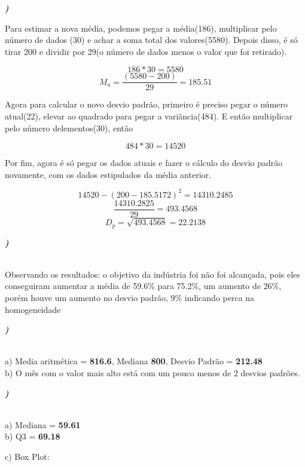 \documentclass[12pt]{article}
\newcounter{instn}
\newcommand{\instnum}{\arabic{instn}}
\newcommand{\myline}[1]{
    \emph{\textbf{#1)}}
    \addtocounter{instn}{1}
}
\begin{document}
    \myline{\instnum} Para estimar a nova média, podemos pegar a média(186), multiplicar pelo número de dados (30)
    e achar a soma total dos valores(5580). Depois disso, é só tirar 200 e dividir por 29(o número de dados menos o
    valor que foi retirado).

        \[186 * 30 = 5580\]
        \[M_a = \frac{(5580 - 200)}{29} = 185.51\]

    Agora para calcular o novo desvio padrão, primeiro é preciso pegar o número atual(22), elevar ao quadrado 
    para pegar a variância(484). E então multiplicar pelo número delementos(30), então 

        \[484 * 30 = 14520\] 

    Por fim, agora é só pegar os dados atuais e fazer o cálculo do desvio padrão novamente, com os dados estipulados 
    da média anterior.

        \[14520 - (200 - 185.5172)^2 = 14310.2485\]
        \[\frac{14310.2825}{29} = 493.4568\]
        \[D_p = \sqrt{493.4568} = 22.2138\]

    \myline{\instnum} \\ Observando os resultados: o objetivo da indústria foi não foi alcançada, pois eles conseguiram aumentar
    a média de 59.6\% para 75.2\%, um aumento de 26\%, porém houve um aumento no desvio padrão, 9\% indicando perca na
    homogeneidade


    \myline{\instnum} \\ a) Media aritmética = \textbf{816.6}, Mediana \textbf{800}, Desvio Padrão = \textbf{212.48}
    \\ b) O mês com o valor mais alto está com um pouco menos de 2 desvios padrões.


    \myline{\instnum} \\ a) Mediana = \textbf{59.61} \\ b) Q3 = \textbf{69.18}

    c) Box Plot: 
    \begin{center}
    \end{center}
\end{document}
